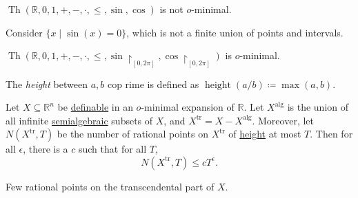 \begin{remark}
	\(\mathop{\mathrm{Th}}(\mathbb{R} , 0, 1, +, -, \cdot, \leq , \sin , \cos ) \) is not \(o\)-minimal.
\end{remark}
\begin{explanation}
	Consider \(\{ x \mid \sin (x) = 0 \} \), which is not a finite union of points and intervals.
\end{explanation}

\begin{remark}
	\(\mathop{\mathrm{Th}}(\mathbb{R} , 0, 1, +, -, \cdot, \leq , \sin{} \upharpoonright _{[0, 2\pi ]}, \cos{} \upharpoonright _{[0, 2\pi ]}) \) is \(o\)-minimal.
\end{remark}

\begin{definition}[Height]\label{def:height}
	The \emph{height} between \(a, b\) cop rime is defined as \(\mathop{\mathrm{height}}(a / b) \coloneqq \max (a, b)\).
\end{definition}

\begin{theorem}
	Let \(X \subseteq \mathbb{R} ^n\) be \hyperref[def:definable]{definable} in an \(o\)-minimal expansion of \(\mathbb{R} \). Let \(X^{\mathrm{alg} }\) is the union of all infinite \hyperref[def:semialgebraic]{semialgebraic} subsets of \(X\), and \(X^{\mathrm{tr} } = X - X^{\mathrm{alg} }\). Moreover, let \(N(X^{\mathrm{tr} }, T)\) be the number of rational points on \(X^{\mathrm{tr} }\) of \hyperref[def:height]{height} at most \(T\). Then for all \(\epsilon \), there is a \(c\) such that for all \(T\),
	\[
		N(X^{\mathrm{tr} }, T) \leq c T^{\epsilon } .
	\]
\end{theorem}

\begin{intuition}
	Few rational points on the transcendental part of \(X\).
\end{intuition}


